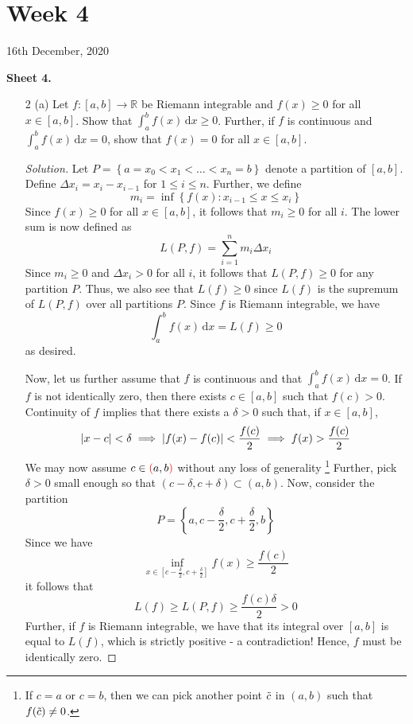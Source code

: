 \documentclass[12pt]{article}
\def\D{\mathrm{d}}
\theoremstyle{definition}
\newenvironment{soln}{\begin{proof}[Solution]}{\end{proof}}
\begin{document}
\newpage\section{Week 4}
\begin{center}
	16th December, 2020
\end{center}
\textbf{Sheet 4.}

\begin{enumerate}[leftmargin=*]
    \itemsep0.5em
    \item[2 (a)] Let $f \colon [a,b] \rightarrow \mathbb{R}$ be Riemann integrable and $f(x) \geq 0$ for all $x \in [a,b]$. Show that $\displaystyle\int_a^b f(x) \, \D x \geq 0$. Further, if $f$ is continuous and $\displaystyle\int_a^b f(x) \, \D x = 0$, show that $f(x) = 0$ for all $x \in [a,b]$.
    
    \begin{soln}
        Let $P = \left\{ a=x_0 <  x_1 < \ldots < x_n = b \right\}$ denote a partition of $[a,b]$. Define $\Delta x_i = x_i - x_{i-1}$ for $1 \leq i \leq n$. Further, we define
        \[
            m_i = \inf \left\{ f(x) \colon x_{i-1} \leq x \leq x_i \right\}
        \]
        Since $f(x) \geq 0$ for all $x \in [a,b]$, it follows that $m_i \geq 0$ for all $i$. The lower sum is now defined as
        \[
            L(P,f) = \sum_{i=1}^{n} m_i \Delta x_i
        \]
        Since $m_i \geq 0$ and $\Delta x_i > 0$ for all $i$, it follows that $L(P, f) \geq 0$ for any partition $P$. Thus, we also see that $L(f) \geq 0$ since $L(f)$ is the supremum of $L(P,f)$ over all partitions $P$. Since $f$ is Riemann integrable, we have
        \[
            \int_a^b f(x) \, \D x = L(f) \geq 0
        \]
        as desired. 
        
        \medskip
        
        Now, let us further assume that $f$ is continuous and that $\int_a^b f(x) \, \D x = 0$. If $f$ is not identically zero, then there exists $c \in [a,b]$ such that $f(c) > 0$. Continuity of $f$ implies that there exists a $\delta > 0$ such that, if $x \in [a,b]$, 
        \[
            \abs{x-c} < \delta \implies \abs{f(x) - f(c)} < \frac{f(c)}{2} \implies f(x) > \frac{f(c)}{2}
        \]
        We may now assume $c \in {\color{red}(}a,b{\color{red})}$ without any loss of generality \footnote{If $c=a$ or $c=b$, then we can pick another point $\Tilde{c}$ in $(a,b)$ such that $f(\Tilde{c}) \neq 0$.} Further, pick $\delta > 0$ small enough so that $(c-\delta, c+\delta) \subset (a,b)$. Now, consider the partition
        \[
            P = \left\{ a, c-\frac{\delta}{2}, c+\frac{\delta}{2}, b \right\}
        \]
        Since we have
        \[
            \inf\limits_{x \in [c-\frac{\delta}{2}, c+\frac{\delta}{2}]} f(x) \geq \frac{f(c)}{2}
        \]
        it follows that
        \[
            L(f) \geq L(P,f) \geq \frac{f(c) \delta}{2} > 0
        \]
        Further, if $f$ is Riemann integrable, we have that its integral over $[a,b]$ is equal to $L(f)$, which is strictly positive - a contradiction! Hence, $f$ must be identically zero.
    \end{soln}
    

\end{enumerate}
\end{document}
